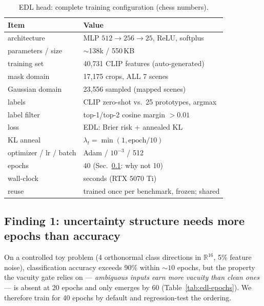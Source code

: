 \documentclass[journal]{IEEEtran}
\begin{document}
\begin{table}[t]
\caption{EDL head: complete training configuration (chess numbers).}
\label{tab:edl-setup}
\centering\scriptsize
\setlength{\tabcolsep}{3pt}
\begin{tabular}{@{}ll@{}}
\toprule
Item & Value \\
\midrule
architecture & MLP $512{\to}256{\to}25$, ReLU, softplus \\
parameters / size & $\sim$138k / 550\,KB \\
training set & 40{,}731 CLIP features (auto-generated) \\
\quad mask domain & 17{,}175 crops, ALL 7 scenes \\
\quad Gaussian domain & 23{,}556 sampled (mapped scenes) \\
labels & CLIP zero-shot vs.\ 25 prototypes, argmax \\
label filter & top-1/top-2 cosine margin $> 0.01$ \\
loss & EDL: Brier risk + annealed KL~\cite{edl} \\
KL anneal & $\lambda_t = \min(1, \mathrm{epoch}/10)$ \\
optimizer / lr / batch & Adam / $10^{-3}$ / 512 \\
epochs & 40 (Sec.~\ref{sec:edl-epochs}: why not 10) \\
wall-clock & seconds (RTX 5070 Ti) \\
reuse & trained once per benchmark, frozen; shared \\
\bottomrule
\end{tabular}
\end{table}

\subsection{Finding 1: uncertainty structure needs more epochs than accuracy}
\label{sec:edl-epochs}
On a controlled toy problem (4 orthonormal class directions in
$\mathbb{R}^{16}$, 5\% feature noise), classification accuracy exceeds 90\%
within ${\sim}10$ epochs, but the property the vacuity gate relies on ---
\emph{ambiguous inputs earn more vacuity than clean ones} --- is absent at 20
epochs and only emerges by 60 (Table~\ref{tab:edl-epochs}). We therefore
train for 40 epochs by default and regression-test the ordering.
\end{document}
